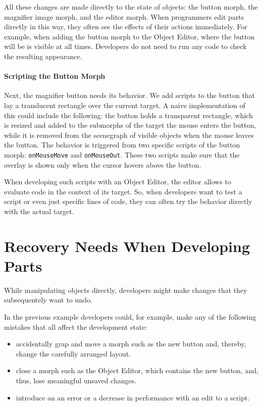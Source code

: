 All these changes are made directly to the state of objects: the button morph, the magnifier image morph, and the editor morph.
When programmers edit parts directly in this way, they often see the effects of their actions immediately.
For example, when adding the button morph to the Object Editor, where the button will be is visible at all times.
Developers do not need to run any code to check the resulting appearance.

\paragraph{Scripting the Button Morph}
Next, the magnifier button needs its behavior.
We add scripts to the button that lay a translucent rectangle over the current target.
A naive implementation of this could include the following: the button holds a transparent rectangle, which is resized and added to the submorphs of the target the mouse enters the button, while it is removed from the scenegraph of visible objects when the mouse leaves the button.
The behavior is triggered from two specific scripts of the button morph: \lstinline{onMouseMove} and \lstinline{onMouseOut}.
These two scripts make sure that the overlay is shown only when the cursor hovers above the button.

When developing such scripts with an Object Editor, the editor allows to evaluate code in the context of its target.
So, when developers want to test a script or even just specific lines of code, they can often try the behavior directly with the actual target.


\section{Recovery Needs When Developing Parts}

While manipulating objects directly, developers might make changes that they subsequentely want to undo.

In the previous example developers could, for example, make any of the following mistakes that all affect the development state:

\begin{itemize}
    \item accidentally grap and move a morph such as the new button and, thereby, change the carefully arranged layout.
    \item close a morph such as the Object Editor, which contains the new button, and, thus, lose meaningful unsaved changes.
    \item introduce an an error or a decrease in performance with an edit to a script.
\end{itemize}

